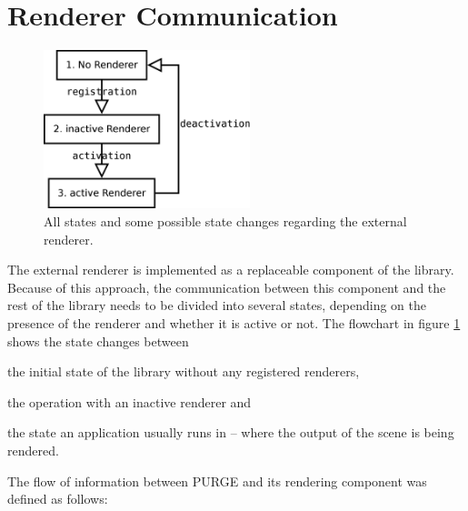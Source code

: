 \section{Renderer Communication}
\label{chapter:implementation:renderer}

	\begin{figure}[htbp]
		\centering
		\includegraphics[width=6cm]{images/RendererFlowchart.png}
		\caption{All states and some possible state changes regarding the external renderer.}
		\label{fig:RendererFlowchart}
	\end{figure}


	The external renderer is implemented as a replaceable component of the library. Because of this approach, the communication between this component and the rest of the library needs to be divided into several states, depending on the presence of the renderer and whether it is active or not. The flowchart in figure \ref{fig:RendererFlowchart} shows the state changes between


	\begin{numlist}
		\item the initial state of the library without any registered renderers,
		\item the operation with an inactive renderer and
		\item the state an application usually runs in -- where the output of the scene is being rendered.
	\end{numlist}

	The flow of information between PURGE and its rendering component was defined as follows:

